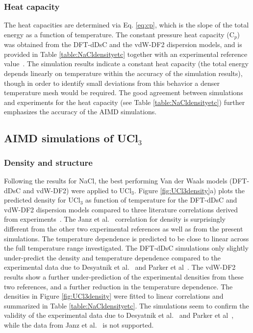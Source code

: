 \documentclass[preprint,3p,10pt,onecolumn,number,sort&compress]{elsarticle}
\begin{document}
\subsubsection{Heat capacity} 
The heat capacities are determined via Eq. \ref{eq:cp}, which is the slope of the total energy as a function of temperature. The constant pressure heat capacity (C$_p$) was obtained from the DFT-dDsC and the vdW-DF2 dispersion models, and is provided in Table \ref{table:NaCldensityetc} together with an experimental reference value~\cite{NIST}. The simulation results indicate a constant heat capacity {\color{red}(the total energy depends linearly on temperature within the accuracy of the simulation results)}, though in order to identify small deviations from this behavior a denser temperature mesh would be required. The good agreement between simulations and experiments for the heat capacity (see Table \ref{table:NaCldensityetc}) further emphasizes the accuracy of the AIMD simulations.

\FloatBarrier

\subsection{AIMD simulations of UCl$_3$}
\subsubsection{Density and structure}
Following the results for NaCl, the best performing Van der Waals models (DFT-dDsC and vdW-DF2) were applied to UCl$_3$. Figure \ref{fig:UCl3density}a) plots the predicted density for UCl$_3$ as function of temperature for the DFT-dDsC and vdW-DF2 dispersion models compared to three literature correlations derived from experiments~\cite{Janz1988,Desyatnik,Parker}. The Janz et al.~\cite{Janz1988} correlation for density is surprisingly different from the other two experimental references as well as from the present simulations. The temperature dependence is predicted to be close to linear across the full temperature range investigated. The DFT-dDsC simulations only slightly under-predict the density and temperature dependence compared to the experimental data due to Desyatnik et al.~\cite{Desyatnik} and Parker et al~\cite{Parker}. The vdW-DF2 results show a further under-prediction of the experimental densities from these two references, and a further reduction in the temperature dependence. The densities in Figure \ref{fig:UCl3density} were fitted to linear correlations and summarized in Table \ref{table:NaCldensityetc}. The simulations seem to confirm the validity of the experimental data due to Desyatnik et al.~\cite{Desyatnik} and Parker et al~\cite{Parker}, while the data from Janz et al.~\cite{Janz1988} is not supported.
 
\end{document}

